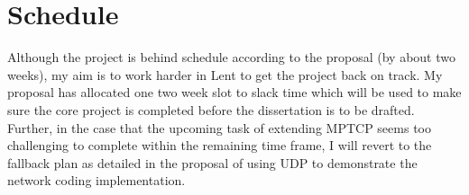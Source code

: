 \documentclass[12pt,a4paper,twoside]{article}
\begin{document}
\section*{Schedule}

Although the project is behind schedule according to the proposal (by about two weeks), my aim is to work harder in Lent to get the project back on track. My proposal has allocated one two week slot to slack time which will be used to make sure the core project is completed before the dissertation is to be drafted. Further, in the case that the upcoming task of extending MPTCP seems too challenging to complete within the remaining time frame, I will revert to the fallback plan as detailed in the proposal of using UDP to demonstrate the network coding implementation. 
\end{document}
